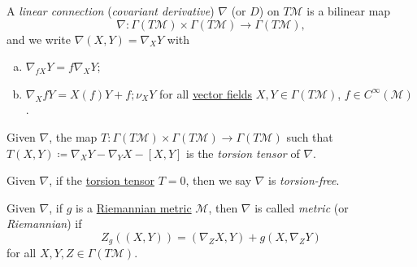 \begin{definition}\label{def:linear-connection}
	A \emph{linear connection} (\emph{covariant derivative}) \(\nabla \) (or \(D\)) on \(T\mathcal{M} \) is a bilinear map
	\[
		\nabla \colon \Gamma (T \mathcal{M} ) \times \Gamma (T \mathcal{M} ) \to \Gamma (T \mathcal{M} ),
	\]
	and we write \(\nabla (X, Y) = \nabla _X Y\) with
	\begin{enumerate}[(a)]
		\item \(\nabla _{fX}Y = f \nabla _X Y\);
		\item \(\nabla _X fY = X(f)Y + f;\nu _X Y\) for all \hyperref[def:vector-field]{vector fields} \(X, Y\in \Gamma (T \mathcal{M} )\), \(f\in C^{\infty} (\mathcal{M} )\).
	\end{enumerate}
\end{definition}


\begin{definition}\label{def:torsion-tensor}
	Given \(\nabla \), the map \(T\colon \Gamma (T \mathcal{M} )\times \Gamma (T \mathcal{M} )\to \Gamma (T \mathcal{M} )\) such that \(T(X, Y) \coloneqq \nabla _X Y - \nabla _Y X - [X, Y]\) is the \emph{torsion tensor} of \(\nabla \).
\end{definition}

\begin{definition}\label{def:torsion-free}
	Given \(\nabla \), if the \hyperref[def:torsion-tensor]{torsion tensor} \(T= 0\), then we say \(\nabla \) is \emph{torsion-free}.
\end{definition}

\begin{definition}\label{def:metric-connection}
	Given \(\nabla \), if \(g\) is a \hyperref[def:Riemannian-metric]{Riemannian metric} \(\mathcal{M} \), then \(\nabla \) is called \emph{metric} (or \emph{Riemannian}) if
	\[
		Z_g((X, Y)) = (\nabla _Z X, Y) + g(X, \nabla _Z Y)
	\]
	for all \(X, Y, Z\in \Gamma (T \mathcal{M} )\).
\end{definition}

